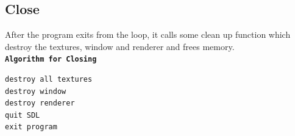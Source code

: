 \documentclass[report]{subfiles}
\begin{document}
    \subsection{Close}
    After the program exits from the loop, it calls some clean up function which destroy the textures, window and renderer and frees memory.\\
        \textbf{\texttt{Algorithm for Closing}}
        \begin{verbatim}
destroy all textures
destroy window
destroy renderer
quit SDL
exit program
        \end{verbatim}
\end{document}
